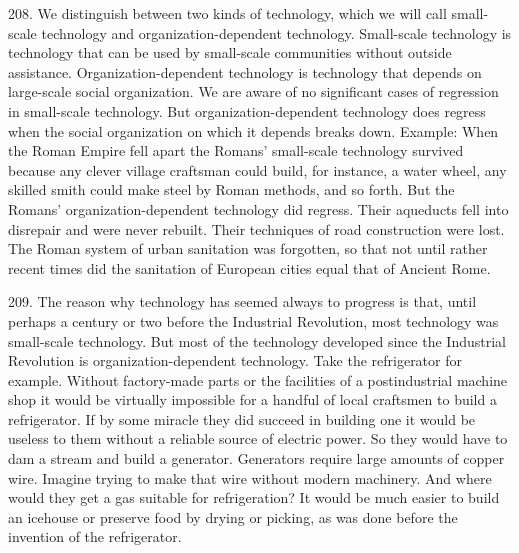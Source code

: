 \documentclass{article}
\begin{document}
208.  We distinguish between two kinds of technology, which we will call small-scale technology 
and  organization-dependent  technology.   Small-scale  technology  is  technology  that  can  be  used  
by  small-scale  communities  without  outside  assistance.   Organization-dependent  technology  is  
technology that depends on large-scale social organization.  We are aware of no significant cases 
of  regression  in  small-scale  technology.   But  organization-dependent  technology  does  regress 
when  the  social  organization  on  which  it  depends  breaks  down.   Example:  When  the  Roman  
Empire  fell  apart  the  Romans’  small-scale  technology  survived  because  any  clever  village  
craftsman could build, for instance, a water wheel, any skilled smith could make steel by Roman 
methods,  and  so  forth.   But  the  Romans’  organization-dependent  technology  did  regress.   Their 
aqueducts fell into disrepair and were never rebuilt.  Their techniques of road construction were 
lost.  The Roman system of urban sanitation was forgotten, so that not until rather recent times did 
the sanitation of European cities equal that of Ancient Rome. \vspace{\baselineskip}

209.  The reason why technology has seemed always to progress is that, until perhaps a century or 
two before the Industrial Revolution, most technology was small-scale technology.  But most of 
the technology developed since the Industrial Revolution is organization-dependent 
technology.  Take the refrigerator for example.  Without factory-made parts or the facilities of a 
postindustrial machine shop it would be virtually impossible for a handful of local craftsmen to 
build a refrigerator.  If by some miracle they did succeed in building one it would be useless to 
them without a reliable source of electric power.  So they would have to dam a stream and build a 
generator.   Generators  require  large  amounts  of  copper  wire.   Imagine  trying  to  make  that  wire  
without modern machinery.  And where would they get a gas suitable for refrigeration? It would 
be much easier to build an icehouse or preserve food by drying or picking, as was done before the 
invention of the refrigerator. \vspace{\baselineskip}
\end{document}

